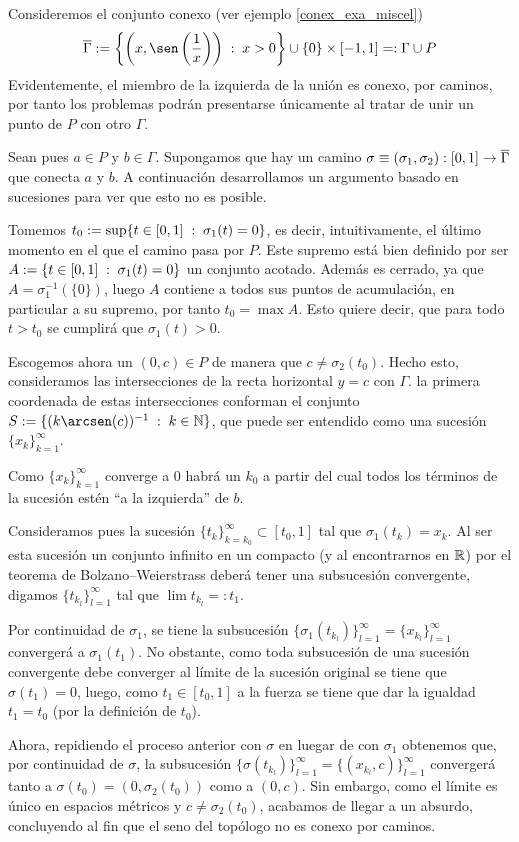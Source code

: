 \begin{exa}
	\label{cam_exa_seno}
	Consideremos el conjunto conexo (ver ejemplo \ref{conex_exa_miscel}) \[\adher{\Gamma}:=\left\{\left(x,\sen\left(\frac{1}{x}\right)\right)\midc x>0\right\}\cup\{0\}\times[-1,1]=:\Gamma\cup P\]
	Evidentemente, el miembro de la izquierda de la unión es conexo, por caminos, por tanto los problemas podrán presentarse únicamente al tratar de unir un punto de $P$ con otro $\Gamma$.
	
	Sean pues $a\in P$ y $b\in \Gamma$. Supongamos que hay un camino $\sigma\equiv(\sigma_1,\sigma_2):[0,1]\to\overline{\Gamma}$ que conecta $a$ y $b$. A continuación desarrollamos un argumento basado en sucesiones para ver que esto no es posible.
	
	Tomemos $t_0:=\sup\{t\in[0,1]\;:\; \sigma_1(t)=0\}$, es decir, intuitivamente, el último momento en el que el camino pasa por $P$. Este supremo está bien definido por ser $A:=\{t\in[0,1]\;:\; \sigma_1(t)=0\}$ un conjunto acotado. Además es cerrado, ya que $A=\sigma_1^{-1}(\{0\})$, luego $A$ contiene a todos sus puntos de acumulación, en particular a su supremo, por tanto $t_0=\max A$. Esto quiere decir, que para todo $t>t_0$ se cumplirá que $\sigma_1(t)>0$.
	
	Escogemos ahora un $(0,c)\in P$ de manera que $c\not=\sigma_2(t_0)$. Hecho esto, consideramos las intersecciones de la recta horizontal $y=c$ con $\Gamma$. la primera coordenada de estas intersecciones conforman el conjunto $S:=\{(k\arcsen(c))^{-1}\midc k\in\N\}$, que puede ser entendido como una sucesión $\{x_k\}_{k=1}^\infty$.
	
	Como $\{x_k\}_{k=1}^\infty$ converge a $0$ habrá un $k_0$ a partir del cual todos los términos de la sucesión estén ``a la izquierda'' de $b$.
	
	Consideramos pues la sucesión $\{t_k\}_{k=k_0}^\infty\subset[t_0,1]$ tal que $\sigma_1(t_k)=x_k$. Al ser esta sucesión un conjunto infinito en un compacto (y al encontrarnos en $\mathbb{R}$) por el teorema de Bolzano--Weierstrass deberá tener una subsucesión convergente, digamos $\{t_{k_l}\}_{l=1}^\infty$ tal que $\lim t_{k_l}=:t_1$.
	
	Por continuidad de $\sigma_1$, se tiene la subsucesión $\{\sigma_1(t_{k_l})\}_{l=1}^\infty=\{x_{k_l}\}_{l=1}^\infty$ convergerá a $\sigma_1(t_1)$. No obstante, como toda subsucesión de una sucesión convergente debe converger al límite de la sucesión original se tiene que $\sigma(t_1)=0$, luego, como $t_1\in[t_0,1]$ a la fuerza se tiene que dar la igualdad $t_1 = t_0$ (por la definición de $t_0$).
	
	Ahora, repidiendo el proceso anterior con $\sigma$ en luegar de con $\sigma_1$ obtenemos que, por continuidad de $\sigma$, la subsucesión $\{\sigma(t_{k_l})\}_{l=1}^\infty=\{(x_{k_l},c)\}_{l=1}^\infty$ convergerá tanto a $\sigma(t_0)=(0,\sigma_2(t_0))$ como a $(0,c)$. Sin embargo, como el límite es único en espacios métricos y $c\not=\sigma_2(t_0)$, acabamos de llegar a un absurdo, concluyendo al fin que el seno del topólogo no es conexo por caminos.
\end{exa}
